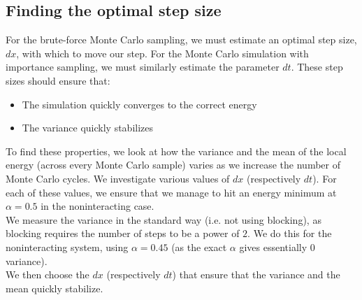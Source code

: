 \documentclass[a4paper, 10pt]{article}
\begin{document}
	\subsection{Finding the optimal step size}\label{sec:finding_optimal_step_size}
	For the brute-force Monte Carlo sampling, we must estimate an optimal step size, $d x$, with which to move our step. For the Monte Carlo simulation with importance sampling, we must similarly estimate the parameter $dt$. These step sizes should ensure that:
	\begin{itemize}
		\item The simulation quickly converges to the correct energy
		\item The variance quickly stabilizes
	\end{itemize}
	To find these properties, we look at how the variance and the mean of the local energy (across every Monte Carlo sample) varies as we increase the number of Monte Carlo cycles. We investigate various values of $dx$ (respectively $dt$). For each of these values, we ensure that we manage to hit an energy minimum at $\alpha=0.5$ in the noninteracting case.\\
	\linebreak
	We measure the variance in the standard way (i.e. not using blocking), as blocking requires the number of steps to be a power of $2$. We do this for the noninteracting system, using $\alpha=0.45$ (as the exact $\alpha$ gives essentially $0$ variance). \\
	\linebreak
	We then choose the $dx$ (respectively $dt$) that ensure that the variance and the mean quickly stabilize.
\end{document}

